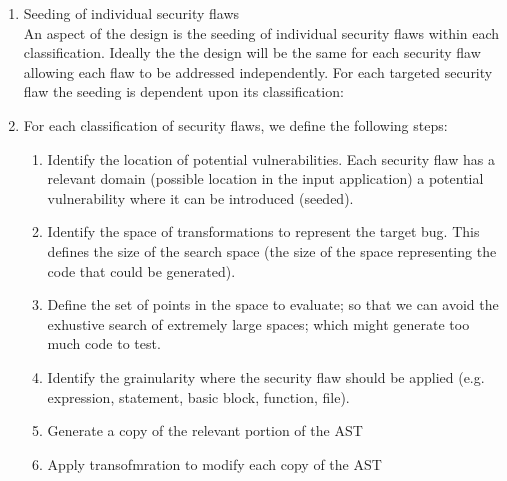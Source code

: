 \begin{enumerate}
   \item Seeding of individual security flaws \\
         An aspect of the design is the seeding of individual security flaws within each 
         classification.  Ideally the the design will be the same for each 
         security flaw allowing each flaw to be addressed independently.
         For each targeted security flaw the seeding is dependent upon
         its classification:
         \item For each classification of security flaws, we define the following steps:
            \begin{enumerate}
               \item Identify the location of potential vulnerabilities. Each security
                     flaw has a relevant domain (possible location in the input
                     application) a potential vulnerability where it 
                     can be introduced (seeded).
               \item Identify the space of transformations to represent the target bug.
                     This defines the size of the search space (the size of the 
                     space representing the code that could be generated).
               \item Define the set of points in the space to evaluate; so that we can
                     avoid the exhustive search of extremely large spaces; which might
                     generate too much code to test.                     
               \item Identify the grainularity where the security flaw should be applied
                     (e.g. expression, statement, basic block, function, file).
               \item Generate a copy of the relevant portion of the AST
               \item Apply transofmration to modify each copy of the AST
            \end{enumerate}


\end{enumerate}
